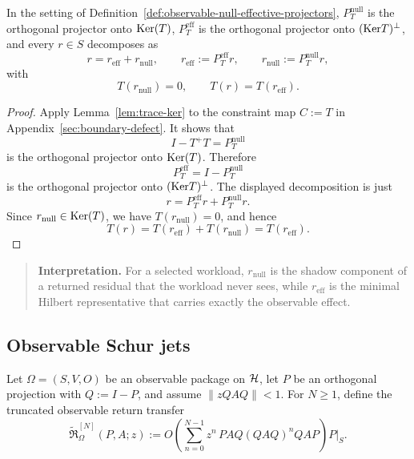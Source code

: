 \begin{proposition}
\label{prop:observable-effective-null-decomposition}
In the setting of
Definition~\ref{def:observable-null-effective-projectors},
\(P_T^{\mathrm{null}}\) is the orthogonal projector onto \(\mathrm{Ker}(T)\),
\(P_T^{\mathrm{eff}}\) is the orthogonal projector onto \((\mathrm{Ker} T)^\perp\), and
every \(r\in S\) decomposes as
\[
r=r_{\mathrm{eff}}+r_{\mathrm{null}},
\qquad
r_{\mathrm{eff}}:=P_T^{\mathrm{eff}}r,
\qquad
r_{\mathrm{null}}:=P_T^{\mathrm{null}}r,
\]
with
\[
T(r_{\mathrm{null}})=0,
\qquad
T(r)=T(r_{\mathrm{eff}}).
\]
\end{proposition}

\begin{proof}
Apply Lemma~\ref{lem:trace-ker} to the constraint map \(C:=T\) in
Appendix~\ref{sec:boundary-defect}. It shows that
\[
I-T^+T=P_T^{\mathrm{null}}
\]
is the orthogonal projector onto \(\mathrm{Ker}(T)\). Therefore
\[
P_T^{\mathrm{eff}}=I-P_T^{\mathrm{null}}
\]
is the orthogonal projector onto \((\mathrm{Ker} T)^\perp\). The displayed
decomposition is just
\[
r=P_T^{\mathrm{eff}}r+P_T^{\mathrm{null}}r.
\]
Since \(r_{\mathrm{null}}\in\mathrm{Ker}(T)\), we have \(T(r_{\mathrm{null}})=0\), and
hence
\[
T(r)=T(r_{\mathrm{eff}})+T(r_{\mathrm{null}})=T(r_{\mathrm{eff}}).
\]
\end{proof}

\begin{quote}\small
\textbf{Interpretation.}
For a selected workload, \(r_{\mathrm{null}}\) is the shadow component of a
returned residual that the workload never sees, while \(r_{\mathrm{eff}}\) is
the minimal Hilbert representative that carries exactly the observable effect.
\end{quote}

\subsection{Observable Schur jets}

\begin{definition}
\label{def:observable-schur-jet-truncation}
Let \(\Omega=(S,V,O)\) be an observable package on \(\mathcal{H}\), let \(P\) be an
orthogonal projection with \(Q:=I-P\), and assume \(\|zQAQ\|<1\). For
\(N\ge 1\), define the truncated observable return transfer
\[
\widetilde{\mathfrak R}_{\Omega}^{[N]}(P,A;z)
:=
O\left(
\sum_{n=0}^{N-1} z^n\,PAQ(QAQ)^nQAP
\right)P\Big|_{S}.
\]
\end{definition}

